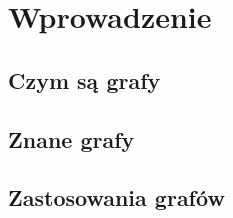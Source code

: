 \chapter{Wprowadzenie}
\section{Czym są grafy}
\section{Znane grafy} \label{sec:common-graphs}
\section{Zastosowania grafów}